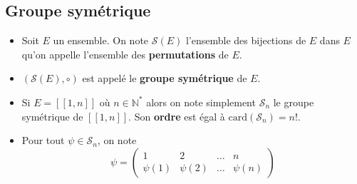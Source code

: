 \subsection{Groupe symétrique} %
\label{sub:Groupe symétrique}

\begin{Definition}[colbacktitle=red!75!black]{}{}
  \begin{itemize}

      \item Soit $E$ un ensemble. On note $\mathscr{S}(E)$ l'ensemble des bijections de $E$ dans $E$ qu'on appelle l'ensemble des \textbf{permutations} de $E$.

      \item $(\mathscr{S}(E), \circ)$ est appelé le \textbf{groupe symétrique} de $E$. 

      \item Si $E = [\![1,n ]\!]$ où $n \in \mathbb{N} ^{*}$ alors on note simplement $\mathscr{S}_n$ le groupe symétrique de $[\![1,n]\!]$.  Son \textbf{ordre} est égal à $\mathrm{card}( \mathscr{S}_n) = n!$. 

      \item Pour tout $\psi \in \mathscr{S}_n$, on note 
\begin{equation}
  \psi = \begin{pmatrix}
    1 & 2 & \dots & n \\ 
    \psi(1) & \psi(2) & \dots & \psi(n)
  \end{pmatrix}
\end{equation}

  \end{itemize}
\end{Definition}


